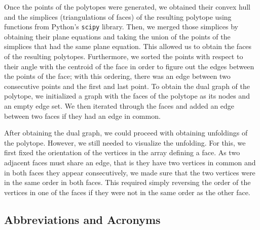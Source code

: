 \documentclass[conference]{IEEEtran}
\begin{document}
Once the points of the polytopes were generated, we obtained their convex hull and the simplices (triangulations of faces) of the resulting polytope using functions from Python's \texttt{scipy} library. Then, we merged those simplices by obtaining their plane equations and taking the union of the points of the simplices that had the same plane equation. This allowed us to obtain the faces of the resulting polytopes. Furthermore, we sorted the points with respect to their angle with the centroid of the face in order to figure out the edges between the points of the face; with this ordering, there was an edge between two consecutive points and the first and last point. To obtain the dual graph of the polytope, we initialized a graph with the faces of the polytope as its nodes and an empty edge set. We then iterated through the faces and added an edge between two faces if they had an edge in common.

After obtaining the dual graph, we could proceed with obtaining unfoldings of the polytope. However, we still needed to visualize the unfolding. For this, we first fixed the orientation of the vertices in the array defining a face. As two adjacent faces must share an edge, that is they have two vertices in common and in both faces they appear consecutively, we made sure that the two vertices were in the same order in both faces. This required simply reversing the order of the vertices in one of the faces if they were not in the same order as the other face. 

\subsection{Abbreviations and Acronyms}
\end{document}
